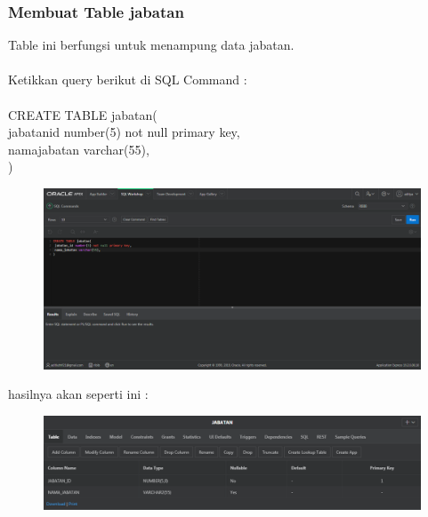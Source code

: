 \documentclass[12pt, times new roman, a4paper]{report}
\begin{document}
\subsubsection{Membuat Table jabatan}
\hspace{1cm} Table ini berfungsi untuk menampung data jabatan.\\
\\
Ketikkan query berikut di SQL Command :\\
\\
CREATE TABLE jabatan(\\
 jabatan\textunderscore id number(5) not null primary key,\\
 nama\textunderscore jabatan varchar(55),\\
)
\begin{figure}[h]
	\centering
		\includegraphics[scale=0.4]{gambar/8}
\end{figure}

\par hasilnya akan seperti ini :
\begin{figure}[h]
	\centering
		\includegraphics[scale=0.5]{gambar/9}
\end{figure}
\end{document}
